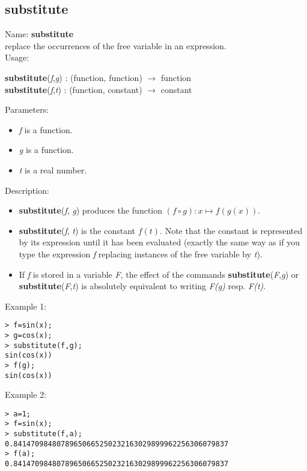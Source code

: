 \subsection{substitute}
\label{labsubstitute}
\noindent Name: \textbf{substitute}\\
replace the occurrences of the free variable in an expression.\\
\noindent Usage: 
\begin{center}
\textbf{substitute}(\emph{f},\emph{g}) : (\textsf{function}, \textsf{function}) $\rightarrow$ \textsf{function}\\
\textbf{substitute}(\emph{f},\emph{t}) : (\textsf{function}, \textsf{constant}) $\rightarrow$ \textsf{constant}\\
\end{center}
Parameters: 
\begin{itemize}
\item \emph{f} is a function.
\item \emph{g} is a function.
\item \emph{t} is a real number.
\end{itemize}
\noindent Description: \begin{itemize}

\item \textbf{substitute}(\emph{f}, \emph{g}) produces the function $(f \circ g) : x \mapsto f(g(x))$.

\item \textbf{substitute}(\emph{f}, \emph{t}) is the constant $f(t)$. Note that the constant is
   represented by its expression until it has been evaluated (exactly the same
   way as if you type the expression \emph{f} replacing instances of the free variable 
   by \emph{t}).

\item If \emph{f} is stored in a variable \emph{F}, the effect of the commands \textbf{substitute}(\emph{F},\emph{g}) or \textbf{substitute}(\emph{F},\emph{t}) is absolutely equivalent to 
   writing \emph{F(g)} resp. \emph{F(t)}.
\end{itemize}
\noindent Example 1: 
\begin{center}\begin{minipage}{15cm}\begin{Verbatim}[frame=single]
> f=sin(x);
> g=cos(x);
> substitute(f,g);
sin(cos(x))
> f(g);
sin(cos(x))
\end{Verbatim}
\end{minipage}\end{center}
\noindent Example 2: 
\begin{center}\begin{minipage}{15cm}\begin{Verbatim}[frame=single]
> a=1;
> f=sin(x);
> substitute(f,a);
0.84147098480789650665250232163029899962256306079837
> f(a);
0.84147098480789650665250232163029899962256306079837
\end{Verbatim}
\end{minipage}\end{center}
